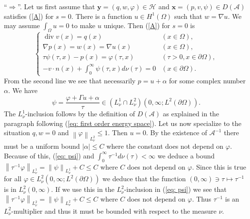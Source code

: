 \documentclass{amsart}
\newcommand{\abs}[1]{\left|#1\right|}
\newcommand{\norm}[1]{\left\| #1 \right\|}
\newcommand{\A}{\mathcal{A}}
\newcommand{\xnice}{\mathbf{x}}
\newcommand{\ynice}{\mathbf{y}}
\newcommand{\Ho}{\mathcal{H}}
\DeclareMathOperator{\Div}{div}
\begin{document}
``$\Rightarrow$''. Let us first assume that $\ynice=(q,w,\varphi)\in\Ho$ and $\xnice=(p,v,\psi)\in D(\A)$ satisfies (\ref{A}) for $s=0$. There is a function $u\in H^1(\Omega)$ such that $w=\nabla u$. We may assume $\int_{\Omega} u=0$ to make $u$ unique. Then (\ref{A}) for $s=0$ is
\begin{equation}\label{eq: A for s=0}
 \begin{cases}
  \Div v(x) = q(x) &  (x\in\Omega), \\
  \nabla p(x) = w(x) = \nabla u(x) & (x\in\Omega), \\
  \tau\psi(\tau,x)-p(x) = \varphi(\tau,x) & (\tau>0, x\in\partial\Omega), \\
  -v\cdot n(x) + \int_0^{\infty} \psi(\tau,x) d\nu(\tau) = 0 & (x\in\partial\Omega).
 \end{cases}
\end{equation}
From the second line we see that necessarily $p=u+\alpha$ for some complex number $\alpha$. We have
\begin{equation}\label{eq: psi}
 \psi = \frac{\varphi + \Gamma u + \alpha}{\tau} \in (L_{\nu}^1\cap L_{\nu}^2)(0,\infty; L^2(\partial\Omega)) .
\end{equation}
The $L^1_{\nu}$-inclusion follows by the definition of $D(\A)$ as explained in the paragraph following (\ref{eq: first order energy space}). Let us now specialize to the situation $q, w = 0$ and $\norm{\varphi}_{L^2_{\nu}}\leq 1$. Then $u=0$. By the existence of $\A^{-1}$ there must be a uniform bound $\abs{\alpha}\leq C$ where the constant does not depend on $\varphi$. Because of this, (\ref{eq: psi}) and $\int_0^{\infty}\tau^{-1} d\nu(\tau)<\infty$ we deduce a bound $\norm{\tau^{-1}\varphi}_{L^1_{\nu}}=\norm{\psi}_{L^1_{\nu}} + C\leq C$ where $C$ does not depend on $\varphi$. Since this is true for all $\varphi\in L^2_{\nu}(0,\infty; L^2(\partial\Omega))$ we deduce that the function $(0,\infty)\owns\tau\mapsto\tau^{-1}$ is in $L^2_{\nu}(0,\infty)$. If we use this in the $L^2_{\nu}$-inclusion in (\ref{eq: psi}) we see that $\norm{\tau^{-1}\varphi}_{L^2_{\nu}}=\norm{\psi}_{L^2_{\nu}} + C\leq C$ where $C$ does not depend on $\varphi$. Thus $\tau^{-1}$ is an $L^2_{\nu}$-multiplier and thus it must be bounded with respect to the measure $\nu$.
\end{document}
